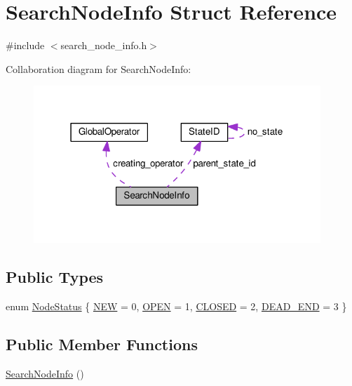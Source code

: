 \hypertarget{structSearchNodeInfo}{\section{Search\-Node\-Info Struct Reference}
\label{structSearchNodeInfo}
}


{\ttfamily \#include $<$search\-\_\-node\-\_\-info.\-h$>$}



Collaboration diagram for Search\-Node\-Info\-:
\nopagebreak
\begin{figure}[H]
\begin{center}
\leavevmode
\includegraphics[width=307pt]{structSearchNodeInfo__coll__graph}
\end{center}
\end{figure}
\subsection*{Public Types}
\begin{DoxyCompactItemize}
\item 
enum \hyperlink{structSearchNodeInfo_a1931bc49f8ccbf3ab52a69c5c98bb941}{Node\-Status} \{ \hyperlink{structSearchNodeInfo_a1931bc49f8ccbf3ab52a69c5c98bb941a7844ed0787c2b82ac3e20754ed485bf1}{N\-E\-W} = 0, 
\hyperlink{structSearchNodeInfo_a1931bc49f8ccbf3ab52a69c5c98bb941aa75a7add9ea5f491ad019cfa8b279fe6}{O\-P\-E\-N} = 1, 
\hyperlink{structSearchNodeInfo_a1931bc49f8ccbf3ab52a69c5c98bb941a6c5b65f8805395a1108de9370966d8c1}{C\-L\-O\-S\-E\-D} = 2, 
\hyperlink{structSearchNodeInfo_a1931bc49f8ccbf3ab52a69c5c98bb941affcaff0f5ee3d219405d77210c05a24b}{D\-E\-A\-D\-\_\-\-E\-N\-D} = 3
 \}
\end{DoxyCompactItemize}
\subsection*{Public Member Functions}
\begin{DoxyCompactItemize}
\item 
\hyperlink{structSearchNodeInfo_a9ab04bdfe10a4ae97498898566cb31f6}{Search\-Node\-Info} ()
\end{DoxyCompactItemize}
